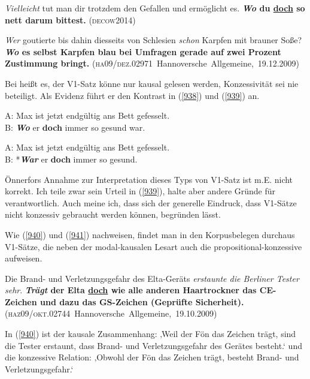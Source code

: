 {\begin{exe}
	\ex\label{936}
	\emph{Vielleicht} tut man dir trotzdem den Gefallen und ermöglicht es. \textbf{\textit{Wo} du \ul{doch} so nett darum bittest.}         
	\hfill\hbox{\scshape(decow2014)}\newline{}
\end{exe}
	
\begin{exe}
	\ex\label{937}

	\emph{Wer} goutierte bis dahin diesseits von Schlesien \emph{schon} Karpfen mit brauner Soße? \textbf{\textit{Wo} es selbst Karpfen blau bei Umfragen 		gerade auf zwei Prozent Zustimmung bringt.	     }
	\newline  
	\hbox{}\hfill\hbox{(\textsc{ha09/dez.02971} Hannoversche Allgemeine, 19.12.2009)}
\end{exe}	
Bei \citet[161]{Oennerfors1997} heißt es, der V1-Satz könne nur kausal gelesen werden, Konzessivität sei nie beteiligt. Als Evidenz führt er den Kontrast in (\ref{938}) und (\ref{939}) an.

\begin{exe}
	\ex\label{938}
	A: Max ist jetzt endgültig ans Bett gefesselt.\\
	B: \textbf{\textit{Wo}} er \textbf{doch} immer so gesund war.	
	\hfill\hbox{\citet[203]{Oppenrieder1989}}
\end{exe}	

\begin{exe}
	\ex\label{939}
	A: Max ist jetzt endgültig ans Bett gefesselt.\\
	B: *\textbf{\textit{War}} er \textbf{doch} immer so gesund.	
	\hfill\hbox{\citet[161]{Oennerfors1997}}
\end{exe}
Önnerfors Annahme zur Interpretation dieses Typs von V1-Satz ist m.E. nicht korrekt. Ich teile zwar sein Urteil in (\ref{939}), halte aber andere Gründe für verantwortlich. Auch meine ich, dass sich der generelle Eindruck, dass V1-Sätze nicht konzessiv gebraucht werden können, begründen lässt.

Wie (\ref{940}) und (\ref{941}) nachweisen, findet man in den Korpusbelegen durchaus V1-Sätze, die neben der modal-kausalen Lesart auch die propositional-konzessive aufweisen.

\begin{exe}
	\ex\label{940}

	Die Brand- und Verletzungsgefahr des Elta-Geräts \emph{erstaunte die Berliner Tester sehr}. \textbf{\textit{Trägt} der Elta \ul{doch} wie alle 		anderen Haartrockner das CE-Zeichen und dazu das GS-Zeichen (Geprüfte Sicherheit).}
	\newline\hbox{}\hfill\hbox{(\textsc{haz09/okt.02744} Hannoversche Allgemeine, 19.10.2009)}
\end{exe}
In (\ref{940}) ist der kausale Zusammenhang: ‚Weil der Fön das Zeichen trägt, sind die Tester erstaunt, dass Brand- und Verletzungsgefahr des Gerätes besteht.‘ und die konzessive Relation: ‚Obwohl der Fön das Zeichen trägt, besteht Brand- und Verletzungsgefahr.‘

}
